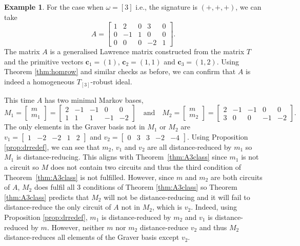 \documentclass[a4paper, 12pt]{article}
\theoremstyle{plain}
\theoremstyle{definition}
\newtheorem{example}[theorem]{Example}
\theoremstyle{remark}
\begin{document}
\begin{example}
    For the case when $\omega=[3]$ i.e., the signature is $(+,+,+)$, we can take
    $$A=\begin{bmatrix}
        1&2&0&3&0 \\
        0&-1&1&0&0\\
        0&0&0&-2&1
    \end{bmatrix}.$$
The matrix $A$ is a generalised Lawrence matrix constructed from the matrix $T$ and the primitive vectors $\mathbf{c}_1=(1)$, $\mathbf{c}_2=(1,1)$ and $\mathbf{c}_3=(1,2)$. Using Theorem \ref{thm:homrow} and similar checks as before, we can confirm that $A$ is indeed a homogeneous $T_{[3]}$-robust ideal. 
    
    This time $A$ has two minimal Markov bases,
  $$M_1=\begin{bmatrix}m\\m_1\end{bmatrix}=\begin{bmatrix}
        2&-1&-1&0&0\\
        1&1&1&-1&-2
    \end{bmatrix} \quad \text{and} \quad M_2=\begin{bmatrix}m\\m_2\end{bmatrix}=\begin{bmatrix}
        2&-1&-1&0&0\\
        3&0&0&-1&-2
    \end{bmatrix}.$$
The only elements in the Graver basis not in $M_1$ or $M_2$ are $v_1=\begin{bmatrix}1&-2&-2&1&2\end{bmatrix}$ and $v_2=\begin{bmatrix}0&3&3&-2&-4\end{bmatrix}$. Using Proposition \ref{prop:drredef}, we can see that $m_2$, $v_1$ and $v_2$ are all distance-reduced by $m_1$ so $M_1$ is distance-reducing. This aligns with Theorem~\ref{thm:A3class} since $m_1$ is not a circuit so $M$ does not contain two circuits and thus the third condition of Theorem~\ref{thm:A3class} is not fulfilled. However, since $m$ and $m_2$ are both circuits of $A$, $M_2$ does fulfil all $3$ conditions of Theorem \ref{thm:A3class} so Theorem \ref{thm:A3class} predicts that $M_2$ will not be distance-reducing and it will fail to distance-reduce the only circuit of $A$ not in $M_2$, which is $v_2$. Indeed, using Proposition \ref{prop:drredef}, $m_1$ is distance-reduced by $m_2$ and $v_1$ is distance-reduced by $m$. However, neither $m$ nor $m_2$ distance-reduce $v_2$ and thus $M_2$ distance-reduces all elements of the Graver basis except $v_2$.%
\end{example}
\end{document}

